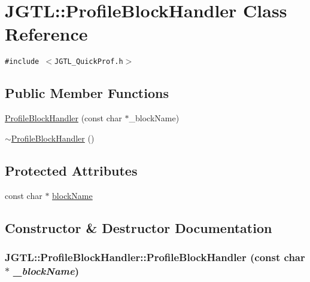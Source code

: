 \hypertarget{class_j_g_t_l_1_1_profile_block_handler}{
\section{JGTL::Profile\-Block\-Handler Class Reference}
\label{class_j_g_t_l_1_1_profile_block_handler}
}
{\tt \#include $<$JGTL\_\-Quick\-Prof.h$>$}

\subsection*{Public Member Functions}
\begin{CompactItemize}
\item 
\hyperlink{class_j_g_t_l_1_1_profile_block_handler_0be8016df83b78fa35c7e31d21fc14e7}{Profile\-Block\-Handler} (const char $\ast$\_\-block\-Name)
\item 
\hyperlink{class_j_g_t_l_1_1_profile_block_handler_f34ae362cae1c68367c1221a088ef71f}{$\sim$Profile\-Block\-Handler} ()
\end{CompactItemize}
\subsection*{Protected Attributes}
\begin{CompactItemize}
\item 
const char $\ast$ \hyperlink{class_j_g_t_l_1_1_profile_block_handler_b6f85efe1308fbe8c802c26411fb28f2}{block\-Name}
\end{CompactItemize}


\subsection{Constructor \& Destructor Documentation}
\hypertarget{class_j_g_t_l_1_1_profile_block_handler_0be8016df83b78fa35c7e31d21fc14e7}{
\subsubsection[ProfileBlockHandler]{\setlength{\rightskip}{0pt plus 5cm}JGTL::Profile\-Block\-Handler::Profile\-Block\-Handler (const char $\ast$ {\em \_\-block\-Name})}}
\label{class_j_g_t_l_1_1_profile_block_handler_0be8016df83b78fa35c7e31d21fc14e7}


